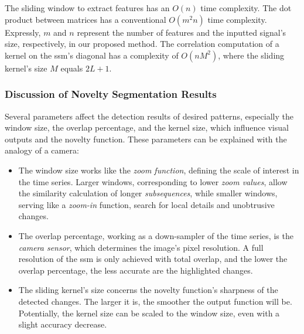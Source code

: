 The sliding window to extract features has an $O(n)$ time complexity. The dot product between matrices has a conventional $O(m^2n)$ time complexity. Expressly, $m$ and $n$ represent the number of features and the inputted signal's size, respectively, in our proposed method. The correlation computation of a kernel on the \gls{ssm}'s diagonal has a complexity of $O(nM^2)$, where the sliding kernel's size $M$ equals $2L+1$.

\subsubsection{Discussion of Novelty Segmentation Results}
\label{sec:novelty_seg_discussion}
Several parameters affect the detection results of desired patterns, especially the window size, the overlap percentage, and the kernel size, which influence visual outputs and the novelty function. These parameters can be explained with the analogy of a camera:

\begin{itemize}
    \item The window size works like the \textit{zoom function}, defining the scale of interest in the time series. Larger windows, corresponding to lower \textit{zoom values}, allow the similarity calculation of longer \textit{subsequences}, while smaller windows, serving like a \textit{zoom-in} function, search for local details and unobtrusive changes.
    \item The overlap percentage, working as a down-sampler of the time series, is the \textit{camera sensor}, which determines the image's pixel resolution. A full resolution of the \gls{ssm} is only achieved with total overlap, and the lower the overlap percentage, the less accurate are the highlighted changes.
    \item The sliding kernel's size concerns the novelty function's sharpness of the detected changes. The larger it is, the smoother the output function will be. Potentially, the kernel size can be scaled to the window size, even with a slight accuracy decrease.
\end{itemize}

